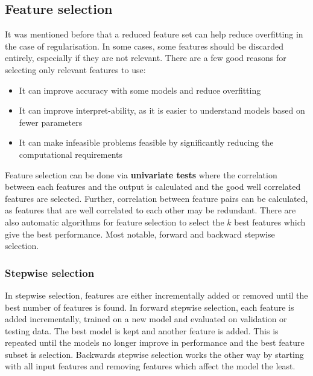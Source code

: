 \documentclass[CS5104-Notes.tex]{subfiles}
\begin{document}
\subsection{Feature selection}
It was mentioned before that a reduced feature set can help reduce overfitting in the case of regularisation. In some cases, some features should be discarded entirely, especially if they are not relevant. There are a few good reasons for selecting only relevant features to use:
\begin{itemize}
\item It can improve accuracy with some models and reduce overfitting
\item It can improve interpret-ability, as it is easier to understand models based on fewer parameters
\item It can make infeasible problems feasible by significantly reducing the computational requirements
\end{itemize}
Feature selection can be done via \textbf{univariate tests} where the correlation between each features and the output is calculated and the good well correlated features are selected. Further, correlation between feature pairs can be calculated, as features that are well correlated to each other may be redundant. 
\n
There are also automatic algorithms for feature selection to select the $k$ best features which give the best performance. Most notable, forward and backward stepwise selection. 
\subsubsection{Stepwise selection}
In stepwise selection, features are either incrementally added or removed until the best number of features is found. In forward stepwise selection, each feature is added incrementally, trained on a new model and evaluated on validation or testing data. The best model is kept and another feature is added. This is repeated until the models no longer improve in performance and the best feature subset is selection.
\n
Backwards stepwise selection works the other way by starting with all input features and removing features which affect the model the least. 
\end{document}
